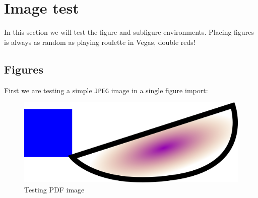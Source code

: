 \documentclass[float=false, crop=false]{standalone}
\begin{document}
\section{Image test}\label{sec:imagetest}
In this section we will test the figure and subfigure environments. Placing figures is always as random as playing roulette in Vegas, double reds!
\subsection{Figures}
First we are testing a simple \texttt{JPEG} image in a single figure import:
\begin{figure}[h!]
    \includegraphics[width=\textwidth]{./img/rect10.png}
    \caption{Testing PDF image}
    \label{fig:pdftest}
\end{figure}
\end{document}

